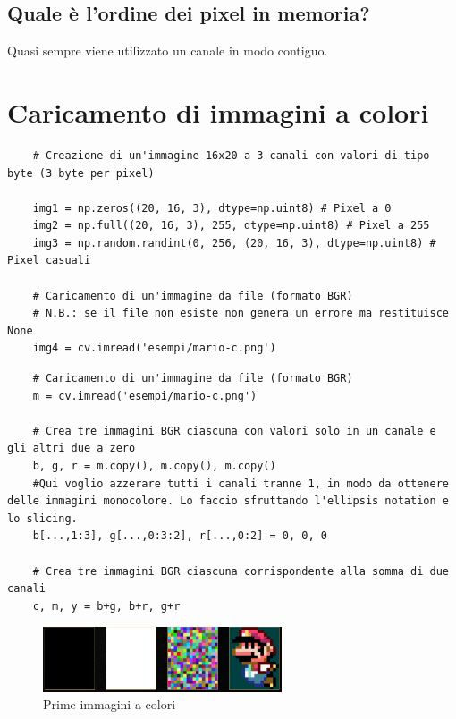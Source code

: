 \subsection{Quale è l'ordine dei pixel in memoria?}

Quasi sempre viene utilizzato un canale in modo contiguo. 

\newpage

\section{Caricamento di immagini a colori}

\begin{lstlisting}
	# Creazione di un'immagine 16x20 a 3 canali con valori di tipo byte (3 byte per pixel)

	img1 = np.zeros((20, 16, 3), dtype=np.uint8) # Pixel a 0
	img2 = np.full((20, 16, 3), 255, dtype=np.uint8) # Pixel a 255
	img3 = np.random.randint(0, 256, (20, 16, 3), dtype=np.uint8) # Pixel casuali

	# Caricamento di un'immagine da file (formato BGR)
	# N.B.: se il file non esiste non genera un errore ma restituisce None
	img4 = cv.imread('esempi/mario-c.png')
\end{lstlisting}


\begin{lstlisting}
	# Caricamento di un'immagine da file (formato BGR)
	m = cv.imread('esempi/mario-c.png')
	
	# Crea tre immagini BGR ciascuna con valori solo in un canale e gli altri due a zero
	b, g, r = m.copy(), m.copy(), m.copy()
	#Qui voglio azzerare tutti i canali tranne 1, in modo da ottenere delle immagini monocolore. Lo faccio sfruttando l'ellipsis notation e lo slicing.
	b[...,1:3], g[...,0:3:2], r[...,0:2] = 0, 0, 0
	
	# Crea tre immagini BGR ciascuna corrispondente alla somma di due canali
	c, m, y = b+g, b+r, g+r
\end{lstlisting}

\begin{figure}[htp]
	\includegraphics[width=200pt]{./immagini/opencv_images_c1.png}
	\caption{Prime immagini a colori}
	\label{img:opencv_images_c1}
\end{figure}

